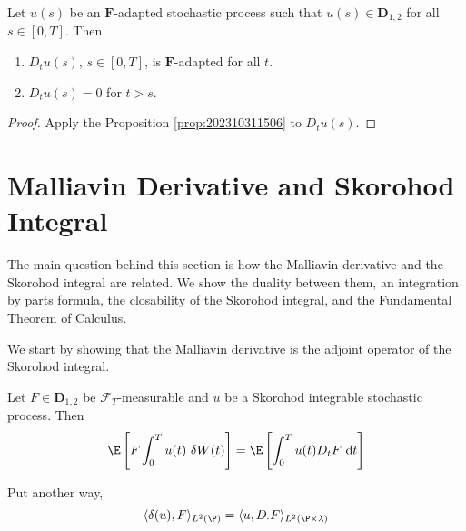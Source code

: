 \begin{corollary}\label{cor:202311071657}
	Let $u(s)$ be an $\mathbf{F}$-adapted stochastic process such that $u(s) \in \mathbf{D}_{1,2}$ for all $s \in [0,T]$. Then 
	\begin{enumerate}
	\item $D_t u(s)$, $s \in [0,T]$, is $\mathbf{F}$-adapted for all $t$. 
	\item $D_t u(s) = 0$ for $t > s$.
	\end{enumerate}
\end{corollary}

\begin{proof}
	Apply the Proposition \ref{prop:202310311506} to $D_t u(s)$.
\end{proof}

\section{Malliavin Derivative and Skorohod Integral} 

The main question behind this section is how the Malliavin derivative and the Skorohod integral are related. We show the duality between them, an integration by parts formula, the closability of the Skorohod integral, and the Fundamental Theorem of Calculus. 

We start by showing that the Malliavin derivative is the adjoint operator of the Skorohod integral.

\begin{theorem}\label{thm:duality_formula}
	Let $F \in \mathbf{D}_{1,2}$ be $\mathcal{F}_T$-measurable and $u$ be a Skorohod integrable stochastic process. Then 
	\begin{equation*}
		\E \left[ F \int_0^T u(t) ~\delta W(t) \right] = \E \left[ \int_0^T u(t) D_t F ~\mathrm{d}t \right]
	\end{equation*}

	Put another way, 
	$$
	\langle \delta(u), F \rangle_{L^2(\P)} = \langle u, D_{\cdot} F \rangle_{L^2(\P \times \lambda)}
	$$
\end{theorem}

